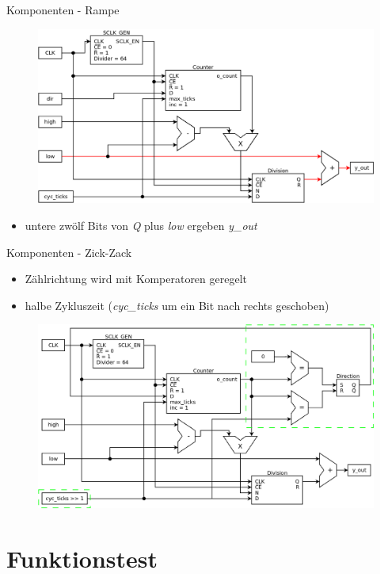 \documentclass[11pt]{beamer}
\begin{document}
\begin{frame}[t]{Komponenten - Rampe}
  \begin{figure}
    \includegraphics[scale=0.28]{ramp_step3}
  \end{figure}
  \begin{itemize}
    \item untere zwölf Bits von \emph{Q} plus \emph{low} ergeben \emph{y\_out}
  \end{itemize}
\end{frame}

\begin{frame}{Komponenten - Zick-Zack}
  \begin{itemize}
    \item Zählrichtung wird mit Komperatoren geregelt
    \item halbe Zykluszeit (\emph{cyc\_ticks} um ein Bit nach rechts geschoben)
  \end{itemize}
  \begin{figure}
    \includegraphics[scale=0.28]{zigzag}
  \end{figure}
\end{frame}

\section{Funktionstest}
\end{document}
